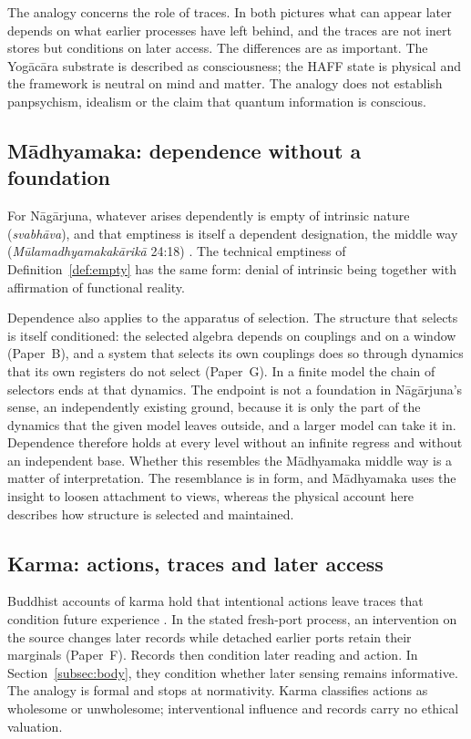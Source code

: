 \documentclass[11pt,a4paper]{article}
\begin{document}
The analogy concerns the role of traces. In both pictures what can appear later depends on what earlier processes have left behind, and the traces are not inert stores but conditions on later access. The differences are as important. The Yog\=ac\=ara substrate is described as consciousness; the HAFF state is physical and the framework is neutral on mind and matter. The analogy does not establish panpsychism, idealism or the claim that quantum information is conscious.

\subsection{M\=adhyamaka: dependence without a foundation}

For N\=ag\=arjuna, whatever arises dependently is empty of intrinsic nature (\emph{svabh\=ava}), and that emptiness is itself a dependent designation, the middle way (\emph{M\=ulamadhyamakak\=arik\=a} 24:18) \cite{Nagarjuna_MMK_Garfield1995,Garfield2002,Siderits2007}. The technical emptiness of Definition~\ref{def:empty} has the same form: denial of intrinsic being together with affirmation of functional reality.

Dependence also applies to the apparatus of selection. The structure that selects is itself conditioned: the selected algebra depends on couplings and on a window (Paper~B), and a system that selects its own couplings does so through dynamics that its own registers do not select (Paper~G). In a finite model the chain of selectors ends at that dynamics. The endpoint is not a foundation in N\=ag\=arjuna's sense, an independently existing ground, because it is only the part of the dynamics that the given model leaves outside, and a larger model can take it in. Dependence therefore holds at every level without an infinite regress and without an independent base. Whether this resembles the M\=adhyamaka middle way is a matter of interpretation. The resemblance is in form, and M\=adhyamaka uses the insight to loosen attachment to views, whereas the physical account here describes how structure is selected and maintained.

\subsection{Karma: actions, traces and later access}

Buddhist accounts of karma hold that intentional actions leave traces that condition future experience \cite{Gombrich1996,Harvey2000}. In the stated fresh-port process, an intervention on the source changes
later records while detached earlier ports retain their marginals
(Paper~F). Records then condition later reading and action.
In Section~\ref{subsec:body}, they condition whether later sensing
remains informative. The analogy is formal and stops at normativity. Karma classifies actions as wholesome or unwholesome; interventional influence and records carry no ethical valuation.
\end{document}
